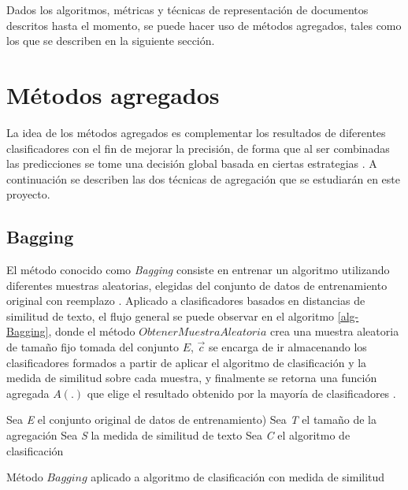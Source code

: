 Dados los algoritmos, métricas y técnicas de representación de documentos descritos hasta el momento, se puede hacer uso de métodos agregados, tales como los que se describen en la siguiente sección.

\section{Métodos agregados}
La idea de los métodos agregados es complementar los resultados de diferentes clasificadores con el fin de mejorar la precisión, de forma que al ser combinadas las predicciones se tome una decisión global basada en ciertas estrategias \cite{sabzevari2015ensemble}. A continuación se describen las dos técnicas de agregación que se estudiarán en este proyecto.  
\subsection{Bagging}
El método conocido como \textit{Bagging} consiste en entrenar un algoritmo utilizando diferentes muestras aleatorias, elegidas del conjunto de datos de entrenamiento original con reemplazo \cite{sabzevari2015ensemble}. Aplicado a clasificadores basados en distancias de similitud de texto, el flujo general se puede observar en el algoritmo \ref{alg-Bagging}, donde el método $ObtenerMuestraAleatoria$ crea una muestra aleatoria de tamaño fijo tomada del conjunto $E$, $\vec{c}$ se encarga de ir almacenando los clasificadores formados a partir de aplicar el algoritmo de clasificación y la medida de similitud sobre cada muestra, y finalmente se retorna una función agregada $A(.)$ que elige el resultado obtenido por la mayoría de clasificadores \cite{sabzevari2015ensemble}.
\begin{algorithm}
\label{alg-Bagging}
Sea \textit{E} el conjunto original de datos de entrenamiento)\;
Sea \textit{T} el tamaño de la agregación\;
Sea \textit{S} la medida de similitud de texto\;
Sea \textit{C} el algoritmo de clasificación\;
\caption{Método $Bagging$ aplicado a algoritmo de clasificación con medida de similitud}
\end{algorithm}

